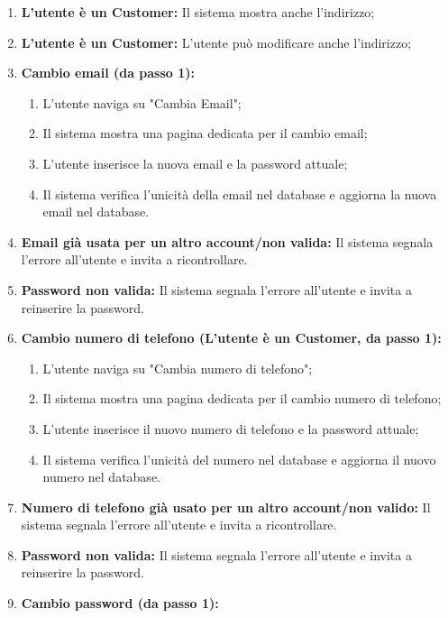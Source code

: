 {
	\begin{enumerate}[nosep, leftmargin=29px]
		\item[\textbf{2a.}] \textbf{L'utente è un Customer:} Il sistema mostra anche l'indirizzo;
		\item[\textbf{3a.}] \textbf{L'utente è un Customer:} L'utente può modificare anche l'indirizzo; 
		\item[\textbf{1a.}] \textbf{Cambio email (da passo 1):}
		\begin{enumerate}[nosep, leftmargin=*]
			\item[i.] L'utente naviga su "Cambia Email"; 
			\item[ii.] Il sistema mostra una pagina dedicata per il cambio email;
			\item[iii.] L'utente inserisce la nuova email e la password attuale; 
			\item[iv.] Il sistema verifica l'unicità della email nel database e aggiorna la nuova email nel database.
		\end{enumerate}
		\item[\textbf{1b-e.}] \textbf{Email già usata per un altro account/non valida:} Il sistema segnala l'errore all'utente e invita a ricontrollare.
		\item[\textbf{1b-e.}] \textbf{Password non valida:} Il sistema segnala l'errore all'utente e invita a reinserire la password.
		\item[\textbf{1c.}] \textbf{Cambio numero di telefono (L'utente è un Customer, da passo 1):} 
		\begin{enumerate}[nosep, leftmargin=*]
			\item[i.] L'utente naviga su "Cambia numero di telefono";
			\item[ii.] Il sistema mostra una pagina dedicata per il cambio numero di telefono;
			\item[iii.] L'utente inserisce il nuovo numero di telefono e la password attuale;
			\item[iv.] Il sistema verifica l'unicità del numero nel database e aggiorna il nuovo numero nel database.
		\end{enumerate}
		\item[\textbf{1c-e.}] \textbf{Numero di telefono già usato per un altro account/non valido:} Il sistema segnala l'errore all'utente e invita a ricontrollare.
		\item[\textbf{1c-e.}] \textbf{Password non valida:} Il sistema segnala l'errore all'utente e invita a reinserire la password.
		\item[\textbf{1d.}] \textbf{Cambio password (da passo 1):}

\end{enumerate}}
